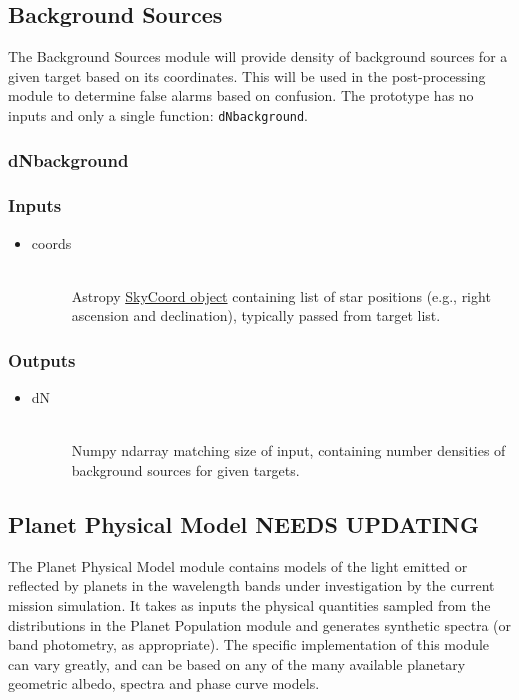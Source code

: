 \documentclass[cleanfoot]{asme2ej}
\begin{document}
\subsection{Background Sources}\label{sec:backgroundsources}

The Background Sources module will provide density of background sources for a given target based on its coordinates.  This will be used in the post-processing module to determine false alarms based on confusion.  The prototype has no inputs and only a single function: \verb+dNbackground+.

\subsubsection{dNbackground}
\subsubsection*{Inputs}
\begin{itemize}
    \item 
    \begin{description}
        \item[coords] \hfill \\
        Astropy \href{http://astropy.readthedocs.org/en/latest/api/astropy.coordinates.SkyCoord.html}{SkyCoord object} containing list of star positions (e.g., right ascension and declination), typically passed from target list.
    \end{description}
\end{itemize}

\subsubsection*{Outputs}
\begin{itemize}
    \item 
    \begin{description}
        \item[dN] \hfill \\
        Numpy ndarray matching size of input, containing number densities of background sources for given targets.
    \end{description}
\end{itemize}



\subsection{Planet Physical Model NEEDS UPDATING} \label{sec:planetphysicalmodel}
The Planet Physical Model module contains models of the light emitted or reflected by planets in the wavelength bands under investigation by the current mission simulation.  It takes as inputs the physical quantities sampled from the distributions in the Planet Population module and generates synthetic spectra (or band photometry, as appropriate).  The specific implementation of this module can vary greatly, and can be based on any of the many available planetary geometric albedo, spectra and phase curve models.
\end{document}
